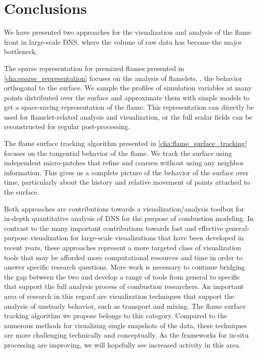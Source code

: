 \chapter{Conclusions} %
\label{cha:flame_vis_conclusions}
%
We have presented two approaches for the visualization and analysis of the flame
front in large-scale \ac{DNS}, where the volume of raw data has become the major
bottleneck.
%

%
The sparse representation for premixed flames presented in
\cref{cha:sparse_representation} focuses on the analysis of flamelets, \ie, the
behavior orthogonal to the surface.
%
We sample the profiles of simulation variables at many points distributed over
the surface and approximate them with simple models to get a space-saving
representation of the flame.
%
This representation can directly be used for flamelet-related analysis and
visualization, or the full scalar fields can be reconstructed for regular
post-processing.
%

%
The flame surface tracking algorithm presented in
\cref{cha:flame_surface_tracking} focuses on the tangential behavior of the
flame.
%
We track the surface using independent micro-patches that refine and coarsen
without using any neighbor information.
%
This gives us a complete picture of the behavior of the surface over time,
particularly about the history and relative movement of points attached to the
surface.
%

%
Both approaches are contributions towards a visualization/analysis toolbox for
in-depth quantitative analysis of \ac{DNS} for the purpose of combustion
modeling.
%
In contrast to the many important contributions towards fast and effective
general-purpose visualization for large-scale visualizations that have been
developed in recent years, these approaches represent a more targeted class
of visualization tools that may be afforded more computational resources and
time in order to answer specific research questions.
%
More work is necessary to continue bridging the gap between the two and
develop a range of tools from general to specific that support the full analysis
process of combustion researchers.
%
An important area of research in this regard are visualization techniques that
support the analysis of unsteady behavior, such as transport and mixing.
%
The flame surface tracking algorithm we propose belongs to this category.
%
Compared to the numerous methods for visualizing single snapshots of the data,
these techniques are more challenging technically and conceptually.
%
As the frameworks for in-situ processing are improving, we will hopefully see
increased activity in this area.
%
